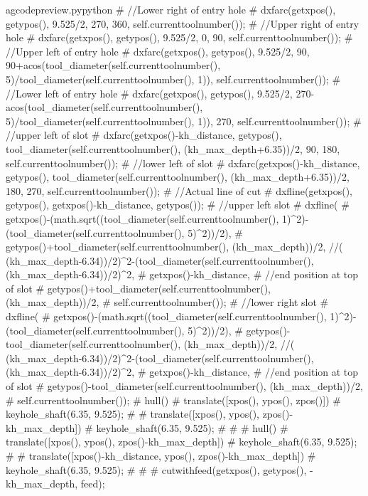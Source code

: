 \documentclass{ltxdoc}
\begin{document}
\begin{writecode}{a}{gcodepreview.py}{python}
{#    //Lower right of entry hole
#    dxfarc(getxpos(), getypos(), 9.525/2, 270, 360, self.currenttoolnumber());
#    //Upper right of entry hole
#    dxfarc(getxpos(), getypos(), 9.525/2, 0, 90, self.currenttoolnumber());
#    //Upper left of entry hole
#    dxfarc(getxpos(), getypos(), 9.525/2, 90, 90+acos(tool_diameter(self.currenttoolnumber(), 5)/tool_diameter(self.currenttoolnumber(), 1)), self.currenttoolnumber());
#    //Lower left of entry hole
#    dxfarc(getxpos(), getypos(), 9.525/2, 270-acos(tool_diameter(self.currenttoolnumber(), 5)/tool_diameter(self.currenttoolnumber(), 1)), 270, self.currenttoolnumber());
#    //upper left of slot
#    dxfarc(getxpos()-kh_distance, getypos(), tool_diameter(self.currenttoolnumber(), (kh_max_depth+6.35))/2, 90, 180, self.currenttoolnumber());
#    //lower left of slot
#    dxfarc(getxpos()-kh_distance, getypos(), tool_diameter(self.currenttoolnumber(), (kh_max_depth+6.35))/2, 180, 270, self.currenttoolnumber());
#    //Actual line of cut
#    dxfline(getxpos(), getypos(), getxpos()-kh_distance, getypos());
#    //upper left slot
#    dxfline(
#        getxpos()-(math.sqrt((tool_diameter(self.currenttoolnumber(), 1)^2)-(tool_diameter(self.currenttoolnumber(), 5)^2))/2), 
#        getypos()+tool_diameter(self.currenttoolnumber(), (kh_max_depth))/2, //( (kh_max_depth-6.34))/2)^2-(tool_diameter(self.currenttoolnumber(), (kh_max_depth-6.34))/2)^2, 
#        getxpos()-kh_distance, 
#    //end position at top of slot
#        getypos()+tool_diameter(self.currenttoolnumber(), (kh_max_depth))/2, 
#        self.currenttoolnumber());
#    //lower right slot
#    dxfline(
#        getxpos()-(math.sqrt((tool_diameter(self.currenttoolnumber(), 1)^2)-(tool_diameter(self.currenttoolnumber(), 5)^2))/2), 
#        getypos()-tool_diameter(self.currenttoolnumber(), (kh_max_depth))/2, //( (kh_max_depth-6.34))/2)^2-(tool_diameter(self.currenttoolnumber(), (kh_max_depth-6.34))/2)^2, 
#        getxpos()-kh_distance, 
#    //end position at top of slot
#        getypos()-tool_diameter(self.currenttoolnumber(), (kh_max_depth))/2, 
#        self.currenttoolnumber());
#    hull(){
#      translate([xpos(), ypos(), zpos()]){
#        keyhole_shaft(6.35, 9.525);
#      }
#      translate([xpos(), ypos(), zpos()-kh_max_depth]){
#        keyhole_shaft(6.35, 9.525);
#      }
#    }
#    hull(){
#      translate([xpos(), ypos(), zpos()-kh_max_depth]){
#        keyhole_shaft(6.35, 9.525);
#      }
#      translate([xpos()-kh_distance, ypos(), zpos()-kh_max_depth]){
#        keyhole_shaft(6.35, 9.525);
#      }
#    }
#    cutwithfeed(getxpos(), getypos(), -kh_max_depth, feed);
}
\end{writecode}
\end{document}
